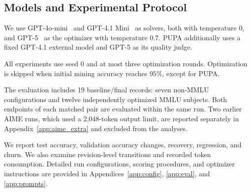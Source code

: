 \documentclass[11pt]{article}
\begin{document}
\begin{table}[!t]
\centering
\small
{}
\caption{Benchmarks and evaluation splits. MMLU splits are per subject. Test sizes precede provider-block exclusions.}
\label{tab:setup}
\end{table}

\subsection{Models and Experimental Protocol}

We use GPT-4o-mini~\citep{openai2024gpt4o} and GPT-4.1 Mini~\citep{openai2025gpt41} as solvers, both with temperature $0$, and GPT-5~\citep{openai2025gpt5} as the optimizer with temperature $0.7$. PUPA additionally uses a fixed GPT-4.1 external model and GPT-5 as its quality judge.

All experiments use seed $0$ and at most three optimization rounds. Optimization is skipped when initial mining accuracy reaches $95\%$, except for PUPA. 

The evaluation includes 19 baseline/final records: seven non-MMLU configurations and twelve independently optimized MMLU subjects. Both endpoints of each matched pair are evaluated within the same run. Two earlier AIME runs, which used a 2,048-token output limit, are reported separately in Appendix~\ref{app:aime_extra} and excluded from the analyses.

We report test accuracy, validation accuracy changes, recovery, regression, and churn. We also examine revision-level transitions and recorded token consumption. Detailed run configurations, scoring procedures, and optimizer instructions are provided in Appendices~\ref{app:config}, \ref{app:eval}, and \ref{app:prompts}.
\end{document}
